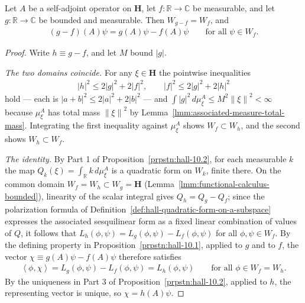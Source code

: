\begin{lemma}
    \label{lmm:functional-calculus-sub-bounded}
    \leanok
    Let $A$ be a self-adjoint operator on $\mathbf{H}$, let $f : \mathbb{R} \to \mathbb{C}$ be measurable, and let $g : \mathbb{R} \to \mathbb{C}$ be bounded and measurable. Then $W_{g - f} = W_f$, and
    \begin{align}
        (g - f)(A)\psi = g(A)\psi - f(A)\psi \qquad \text{for all } \psi \in W_f.
    \end{align}
\end{lemma}
\begin{proof}
    \leanok
Write $h \equiv g - f$, and let $M$ bound $\lvert g \rvert$.

\textit{The two domains coincide.} For any $\xi \in \mathbf{H}$ the pointwise inequalities
\begin{align}
    \lvert h \rvert^2 \le 2\lvert g \rvert^2 + 2\lvert f \rvert^2, \qquad \lvert f \rvert^2 \le 2\lvert g \rvert^2 + 2\lvert h \rvert^2
\end{align}
hold — each is $\lvert a + b \rvert^2 \le 2\lvert a \rvert^2 + 2\lvert b \rvert^2$ — and $\int \lvert g \rvert^2 \, d\mu^A_\xi \le M^2\left\| \xi \right\|^2 < \infty$ because $\mu^A_\xi$ has total mass $\left\| \xi \right\|^2$ by Lemma~\ref{lmm:associated-measure-total-mass}. Integrating the first inequality against $\mu^A_\xi$ shows $W_f \subset W_h$, and the second shows $W_h \subset W_f$.

\textit{The identity.} By Part 1 of Proposition~\ref{prpstn:hall-10.2}, for each measurable $k$ the map $Q_k(\xi) = \int_{\mathbb{R}} k \, d\mu^A_\xi$ is a quadratic form on $W_k$, finite there. On the common domain $W_f = W_h \subset W_g = \mathbf{H}$ (Lemma~\ref{lmm:functional-calculus-bounded}), linearity of the scalar integral gives $Q_h = Q_g - Q_f$; since the polarization formula of Definition~\ref{def:hall-quadratic-form-on-a-subspace} expresses the associated sesquilinear form as a fixed linear combination of values of $Q$, it follows that $L_h(\phi,\psi) = L_g(\phi,\psi) - L_f(\phi,\psi)$ for all $\phi,\psi \in W_f$. By the defining property in Proposition~\ref{prpstn:hall-10.1}, applied to $g$ and to $f$, the vector $\chi \equiv g(A)\psi - f(A)\psi$ therefore satisfies
\begin{align}
    \left< \phi, \chi \right> = L_g(\phi,\psi) - L_f(\phi,\psi) = L_h(\phi,\psi) \qquad \text{for all } \phi \in W_f = W_h.
\end{align}
By the uniqueness in Part 3 of Proposition~\ref{prpstn:hall-10.2}, applied to $h$, the representing vector is unique, so $\chi = h(A)\psi$.
\end{proof}

